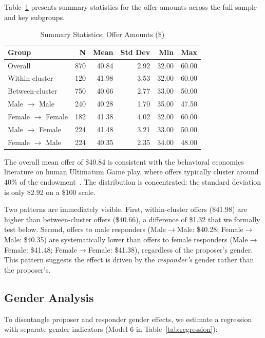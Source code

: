 \documentclass[12pt]{article}
\begin{document}
Table~\ref{tab:summary} presents summary statistics for the offer amounts across the full sample and key subgroups.

\begin{table}[H]
\centering
\caption{Summary Statistics: Offer Amounts (\$)}
\label{tab:summary}
\begin{tabular}{lrrrrr}
\toprule
\textbf{Group} & \textbf{N} & \textbf{Mean} & \textbf{Std Dev} & \textbf{Min} & \textbf{Max} \\
\midrule
Overall                 & 870 & 40.84 & 2.92 & 32.00 & 60.00 \\
\midrule
Within-cluster          & 120 & 41.98 & 3.53 & 32.00 & 60.00 \\
Between-cluster         & 750 & 40.66 & 2.77 & 33.00 & 50.00 \\
\midrule
Male $\to$ Male         & 240 & 40.28 & 1.70 & 35.00 & 47.50 \\
Female $\to$ Female     & 182 & 41.38 & 4.02 & 32.00 & 60.00 \\
Male $\to$ Female       & 224 & 41.48 & 3.21 & 33.00 & 50.00 \\
Female $\to$ Male       & 224 & 40.35 & 2.35 & 34.00 & 48.00 \\
\bottomrule
\end{tabular}
\end{table}

The overall mean offer of \$40.84 is consistent with the behavioral economics literature on human Ultimatum Game play, where offers typically cluster around 40\% of the endowment~\cite{camerer2003}. The distribution is concentrated: the standard deviation is only \$2.92 on a \$100 scale.

Two patterns are immediately visible. First, within-cluster offers (\$41.98) are higher than between-cluster offers (\$40.66), a difference of \$1.32 that we formally test below. Second, offers to male responders (Male$\to$Male: \$40.28; Female$\to$Male: \$40.35) are systematically lower than offers to female responders (Male$\to$Female: \$41.48; Female$\to$Female: \$41.38), regardless of the proposer's gender. This pattern suggests the effect is driven by the \emph{responder's} gender rather than the proposer's.

\subsection{Gender Analysis}

To disentangle proposer and responder gender effects, we estimate a regression with separate gender indicators (Model 6 in Table~\ref{tab:regression}):
\end{document}
